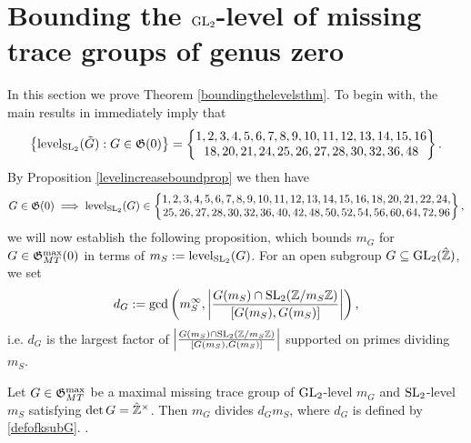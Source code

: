 \section{Bounding the $\operatorname{GL}_2$-level of missing trace groups of genus zero} \label{proofofboundingthelevelsthmsection}

In this section we prove Theorem \ref{boundingthelevelsthm}.  To begin with, the main results in \cite{cumminspauli} immediately imply that
\begin{equation} \label{cumminspaulilevels}
\left\{ \operatorname{level}_{\operatorname{SL}_2}(\tilde{G}) : G \in \mathfrak{G}(0) \right\} = \left\{ \begin{matrix} 1, 2, 3, 4, 5, 6, 7, 8, 9, 10, 11, 12, 13, 14, 15, 16 \\ 18, 20, 21, 24, 25, 26, 27, 28, 30, 32, 36, 48 \end{matrix} \right\}.
\end{equation}
By Proposition \ref{levelincreaseboundprop} we then have
\begin{equation} \label{boundforSL2levels}
G \in \mathfrak{G}(0) \; \Longrightarrow \; \operatorname{level}_{\operatorname{SL}_2}(G) \in \left\{ \begin{matrix} 1, 2, 3, 4, 5, 6, 7, 8, 9, 10, 11, 12, 13, 14, 15, 16, 18, 20, 21, 22, 24, \\ 25, 26, 27, 28, 30, 32, 36, 40, 42, 48, 50, 52, 54, 56, 60, 64, 72, 96 \end{matrix} \right\},
\end{equation}
we will now establish the following proposition, which bounds $m_G$ for $G \in \mathfrak{G}_{MT}^{\max}(0)$ in terms of $m_S := \operatorname{level}_{\operatorname{SL}_2}(G)$.  For an open subgroup $G \subseteq \operatorname{GL}_2(\hat{\mathbb{Z}})$, we set 
\begin{equation} \label{defofksubG}
d_G := \gcd \left( m_S^ \infty, \left| \frac{G(m_S) \cap \operatorname{SL}_2(\mathbb{Z}/m_S\mathbb{Z})}{[G(m_S),G(m_S)]} \right| \right),
\end{equation}
i.e. $d_G$ is the largest factor of $\left| \frac{G(m_S) \cap \operatorname{SL}_2(\mathbb{Z}/m_S\mathbb{Z})}{[G(m_S),G(m_S)]} \right|$ supported on primes dividing $m_S$.
\begin{proposition} \label{twotothekproposition}
Let $G \in \mathfrak{G}_{MT}^{\max}$ be a maximal missing trace group of $\operatorname{GL}_2$-level $m_G$ and $\operatorname{SL}_2$-level $m_S$ satisfying $\det G = \hat{\mathbb{Z}}^\times$.  Then $m_G$ divides $d_G m_S$, where $d_G$ is defined by \eqref{defofksubG}.  .
\end{proposition}
